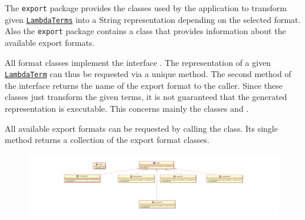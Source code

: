 The \texttt{export} package provides the classes used by the application to transform given \texttt{\hyperref[type:edu.kit.wavelength.client.model.term.LambdaTerm]{LambdaTerms}} into a String representation depending on the selected format. Also the \texttt{export} package contains a \texttt{} class that provides information about the available export formats. 

All format classes implement the interface \texttt{}. The representation of a given \texttt{\hyperref[type:edu.kit.wavelength.client.model.term.LambdaTerm]{LambdaTerm}} can thus be requested via a unique method. 
The second method of the interface returns the name of the export format to the caller.
Since these classes just transform the given terms, it is not guaranteed that the generated representation is executable. This concerns mainly the classes \texttt{} and \texttt{}.

All available export formats can be requested by calling the \texttt{} class. Its single method returns a collection of the export format classes.  

\begin{figure}[H]
	\centering
	\includegraphics[width=\textwidth]{packageDiagrams/exportPackage}
\end{figure}
